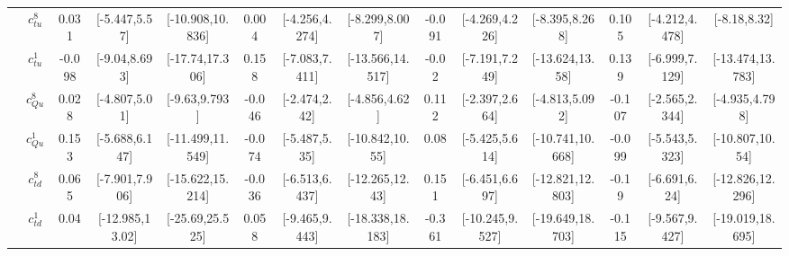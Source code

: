 \documentclass{article}
\begin{document}
\begin{table}[H]
\begin{tabular}{|c|c|c|c|c|c|c|c|c|c|c|c|c|c|}
 & $c_{tu}^{8}$ & 0.031                             & [-5.447,5.57]                                 & [-10.908,10.836] & 0.004                             & [-4.256,4.274]                                 & [-8.299,8.007] & -0.091                             & [-4.269,4.226]                                 & [-8.395,8.268] & 0.105                             & [-4.212,4.478]                                 & [-8.18,8.32] \\ \cline{2-14}
 & $c_{tu}^{1}$ & -0.098                             & [-9.04,8.693]                                 & [-17.74,17.306] & 0.158                             & [-7.083,7.411]                                 & [-13.566,14.517] & -0.02                             & [-7.191,7.249]                                 & [-13.624,13.58] & 0.139                             & [-6.999,7.129]                                 & [-13.474,13.783] \\ \cline{2-14}
 & $c_{Qu}^{8}$ & 0.028                             & [-4.807,5.01]                                 & [-9.63,9.793] & -0.046                             & [-2.474,2.42]                                 & [-4.856,4.62] & 0.112                             & [-2.397,2.664]                                 & [-4.813,5.092] & -0.107                             & [-2.565,2.344]                                 & [-4.935,4.798] \\ \cline{2-14}
 & $c_{Qu}^{1}$ & 0.153                             & [-5.688,6.147]                                 & [-11.499,11.549] & -0.074                             & [-5.487,5.35]                                 & [-10.842,10.55] & 0.08                             & [-5.425,5.614]                                 & [-10.741,10.668] & -0.099                             & [-5.543,5.323]                                 & [-10.807,10.54] \\ \cline{2-14}
 & $c_{td}^{8}$ & 0.065                             & [-7.901,7.906]                                 & [-15.622,15.214] & -0.036                             & [-6.513,6.437]                                 & [-12.265,12.43] & 0.151                             & [-6.451,6.697]                                 & [-12.821,12.803] & -0.19                             & [-6.691,6.24]                                 & [-12.826,12.296] \\ \cline{2-14}
 & $c_{td}^{1}$ & 0.04                             & [-12.985,13.02]                                 & [-25.69,25.525] & 0.058                             & [-9.465,9.443]                                 & [-18.338,18.183] & -0.361                             & [-10.245,9.527]                                 & [-19.649,18.703] & -0.115                             & [-9.567,9.427]                                 & [-19.019,18.695] \\ \cline{2-14}

\end{tabular}
\end{table}
\end{document}
